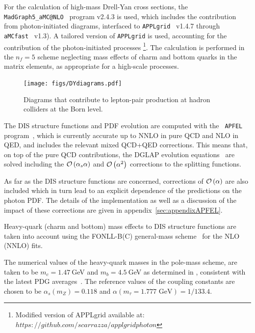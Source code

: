 For the calculation of high-mass Drell-Yan cross sections, the
{\tt MadGraph5{\_}aMC@NLO}~\cite{Alwall:2014hca} program v2.4.3 is used, which
includes the contribution from photon-initiated diagrams, interfaced
to {\tt APPLgrid}~\cite{Carli:2010rw} v1.4.7 through {\tt
  aMCfast}~\cite{amcfast} v1.3).
%
A tailored version of {\tt APPLgrid} is used, accounting for
the contribution of the photon-initiated processes \footnote{Modified version of APPLgrid available at: $https://github.com/scarrazza/applgridphoton$}.
%
The calculation is performed in the $n_f=5$ scheme neglecting mass
effects of charm and bottom quarks in the matrix elements, as
appropriate for a high-scale processes.

\begin{figure}[t]
  \begin{center}
    \texttt{[image: figs/DYdiagrams.pdf]}
    \end{center}
    \caption{Diagrams that contribute to lepton-pair production at
      hadron colliders at the Born level.}
\label{fig:photoninduced}
\end{figure}

The DIS structure functions and PDF evolution are computed with the {\tt
  APFEL} program~\cite{Bertone:2013vaa}, which is currently accurate
up to NNLO in pure QCD and NLO in QED, and includes the relevant mixed
QCD+QED corrections. This means that, on top of the pure QCD
contributions, the DGLAP evolution
equations~\cite{Gribov:1972ri,Dokshitzer:1977,Altarelli:1977zs} are
solved including the $\mathcal{O}\left( \alpha_s\alpha\right)$ and
$\mathcal{O}\left( \alpha^2\right)$ corrections to the splitting functions.

As far as the DIS structure functions are concerned, corrections of
$\mathcal{O}\left( \alpha\right)$ are also included which in turn lead to an
explicit dependence of the predictions on the photon PDF.  The details
of the implementation as well as a discussion of the impact of these
corrections are given in appendix~\ref{sec:appendixAPFEL}.

Heavy-quark (charm and bottom) mass effects to DIS structure functions
are taken into account using the FONLL-B(C) general-mass
scheme~\cite{Forte:2010ta} for the NLO (NNLO) fits.

The numerical values of the heavy-quark masses in the pole-mass
scheme, are taken to be $m_c=1.47~$GeV and $m_b=4.5~$GeV as determined in \cite{Abramowicz:2015mha},  
consistent with the latest PDG averages~\cite{Agashe:2014kda}.
%
The reference values of the coupling constants are chosen to be
$\alpha_s(m_Z)=0.118$ and $\alpha(m_\tau=1.777\mbox{ GeV})=1/133.4$.

